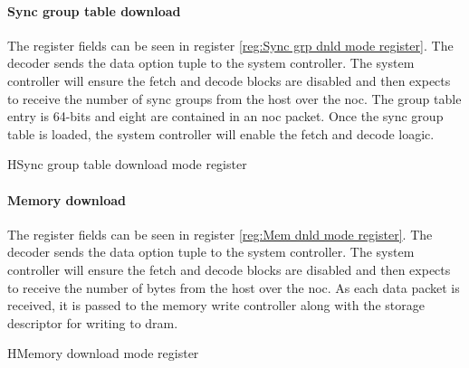 \paragraph{Sync group table download}

The register fields can be seen in register \ref{reg:Sync grp dnld mode register}.
The decoder sends the data option tuple to the system controller.
The system controller will ensure the fetch and decode blocks are disabled and then expects to receive the number of sync groups from the host over the \ac{noc}.
The group table entry is 64-bits and eight are contained in an \ac{noc} packet.
Once the sync group table is loaded, the system controller will enable the fetch and decode loagic.
\begin{register}{H}{Sync group table download mode register}{}%
  \label{reg:Sync grp dnld mode register}
  \vspace{-10pt}
\end{register}

\paragraph{Memory download}

The register fields can be seen in register \ref{reg:Mem dnld mode register}.
The decoder sends the data option tuple to the system controller.
The system controller will ensure the fetch and decode blocks are disabled and then expects to receive the number of bytes from the host over the \ac{noc}.
As each data packet is received, it is passed to the memory write controller along with the storage descriptor for writing to \ac{dram}.
\begin{register}{H}{Memory download mode register}{}%
  \label{reg:Mem dnld mode register}
  \vspace{-10pt}
\end{register}


